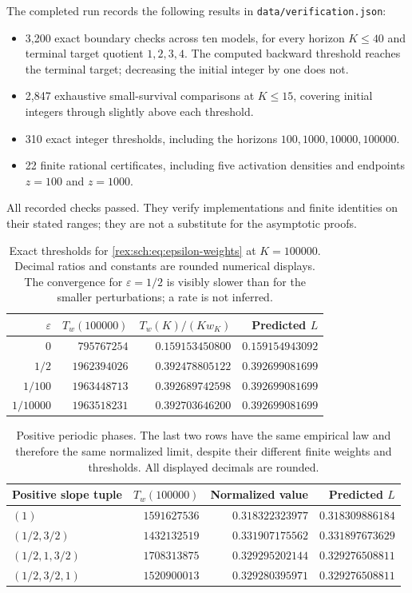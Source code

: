 The completed run records the following results in
\texttt{data/verification.json}:
\begin{itemize}
 \item 3,200 exact boundary checks across ten models, for every
 horizon $K\leq40$ and terminal target quotient $1,2,3,4$.
 The computed backward threshold reaches the terminal target;
 decreasing the initial integer by one does not.
 \item 2,847 exhaustive small-survival comparisons at $K\leq15$,
 covering initial integers through slightly above each threshold.
 \item 310 exact integer thresholds, including the horizons
 $100,1000,10000,100000$.
 \item 22 finite rational certificates, including five activation
 densities and endpoints $z=100$ and $z=1000$.
\end{itemize}
All recorded checks passed. They verify implementations and finite
identities on their stated ranges; they are not a substitute for
the asymptotic proofs.

\begin{table}[tbp]
 \centering\small
 \begin{tabular}{@{}rrrr@{}}
 \toprule
 $\varepsilon$ & $T_w(100000)$ & $T_w(K)/(K w_K)$ & Predicted $L$\\
 \midrule
 $0$ & $795767254$ & $0.159153450800$ & $0.159154943092$\\
 $1/2$ & $1962394026$ & $0.392478805122$ & $0.392699081699$\\
 $1/100$ & $1963448713$ & $0.392689742598$ & $0.392699081699$\\
 $1/10000$ & $1963518231$ & $0.392703646200$ & $0.392699081699$\\
 \bottomrule
 \end{tabular}
 \caption{Exact thresholds for \eqref{rex:sch:eq:epsilon-weights} at
 $K=100000$. Decimal ratios and constants are rounded numerical
 displays. The convergence for $\varepsilon=1/2$ is visibly slower
 than for the smaller perturbations; a rate is not inferred.}
 \label{rex:sch:tab:epsilon}
\end{table}

\begin{table}[tbp]
 \centering\small
 \begin{tabular}{@{}lrrr@{}}
 \toprule
 Positive slope tuple & $T_w(100000)$ & Normalized value & Predicted $L$\\
 \midrule
 $(1)$ & $1591627536$ & $0.318322323977$ & $0.318309886184$\\
 $(1/2,3/2)$ & $1432132519$ & $0.331907175562$ & $0.331897673629$\\
 $(1/2,1,3/2)$ & $1708313875$ & $0.329295202144$ & $0.329276508811$\\
 $(1/2,3/2,1)$ & $1520900013$ & $0.329280395971$ & $0.329276508811$\\
 \bottomrule
 \end{tabular}
 \caption{Positive periodic phases. The last two rows have the
 same empirical law and therefore the same normalized limit,
 despite their different finite weights and thresholds. All
 displayed decimals are rounded.}
 \label{rex:sch:tab:positive}
\end{table}

